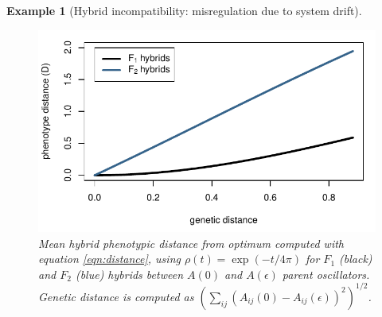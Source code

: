 \documentclass{article}
\newcommand{\1}{\mathbbm{1}}
\newtheorem{example}{Example}
\begin{document}
\begin{example}[Hybrid incompatibility: misregulation due to system drift]
  \begin{figure}[H]
    \centering
    \includegraphics{examples/fig6_small_maxt10}
    \caption{Mean hybrid phenotypic distance from optimum computed with equation \eqref{eqn:distance}, using $\rho(t) = \exp(-t/4\pi)$
    for $F_1$ (black) and $F_2$ (blue) hybrids between $A(0)$ and $A(\epsilon)$ parent oscillators. Genetic distance is computed as 
    $\left(\sum_{ij} (A_{ij}(0) - A_{ij}(\epsilon))^2\right)^{1/2}$.
    }
    \label{fig:osc_incompat}
  \end{figure}
\end{example}
\end{document}
